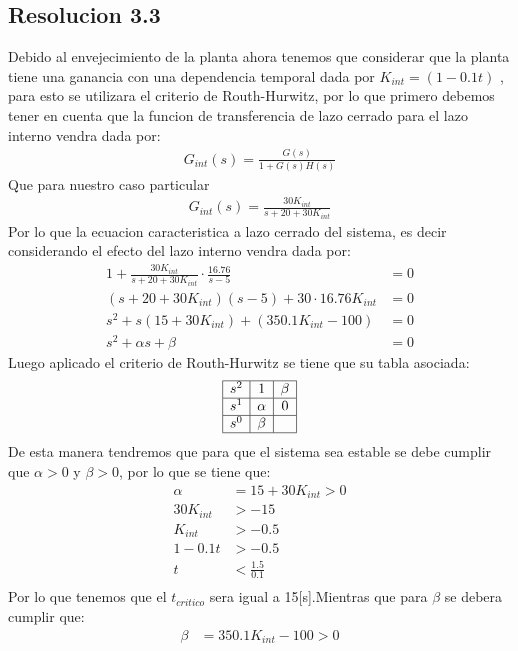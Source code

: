 \documentclass[
  11pt,
  letterpaper,
   addpoints,
   answers
  ]{exam}
\begin{document}
\begin{questions}
\begin{solution}
\subsection*{Resolucion 3.3}
Debido al envejecimiento de la planta ahora tenemos que considerar que la planta tiene una ganancia con una dependencia temporal dada por $K_{int} = (1-0.1t)$ , para esto se utilizara el criterio de Routh-Hurwitz, por lo que primero debemos tener en cuenta que la funcion de transferencia de lazo cerrado para el lazo interno vendra dada por:
\begin{align}
    G_{int}(s) = \frac{G(s)}{1+G(s)H(s)} 
\end{align}
Que para nuestro caso particular
\begin{align}
    G_{int}(s) = \frac{30K_{int}}{s+20+30K_{int}}
\end{align}
Por lo que la ecuacion caracteristica a lazo cerrado del sistema, es decir considerando el efecto del lazo interno vendra dada por:
\begin{align}
    1+ \frac{30K_{int}}{s+20+30K_{int}} \cdot \frac{16.76}{s-5} &= 0\\
    (s+20+30K_{int})(s-5) + 30\cdot 16.76 K_{int} &= 0\\
    s^{2} + s(15+30K_{int}) + (350.1K_{int} - 100 ) &= 0\\
    s^{2} + \alpha s + \beta &= 0
\end{align}
Luego aplicado el criterio de Routh-Hurwitz se tiene que su tabla asociada:
\[
\begin{array}{|c|c|c|}
\hline
s^2 & 1 & \beta \\
\hline
s^1 & \alpha & 0 \\
\hline
s^0 & \beta & \\
\hline
\end{array}
\]
De esta manera tendremos que para que el sistema sea estable se debe cumplir que $\alpha > 0$ y $\beta > 0$, por lo que se tiene que:
\begin{align}
    \alpha &= 15 + 30K_{int} > 0\\
    30K_{int} &> -15\\
    K_{int} &> -0.5\\
    1-0.1t &> -0.5\\
    t &< \frac{1.5}{0.1}\\
\end{align}
Por lo que tenemos que el $t_{critico}$ sera igual a 15[s].Mientras que para $\beta$ se debera cumplir que:
\begin{align}
    \beta &= 350.1K_{int} - 100 > 0\\

\end{align}
\end{solution}
\end{questions}
\end{document}
